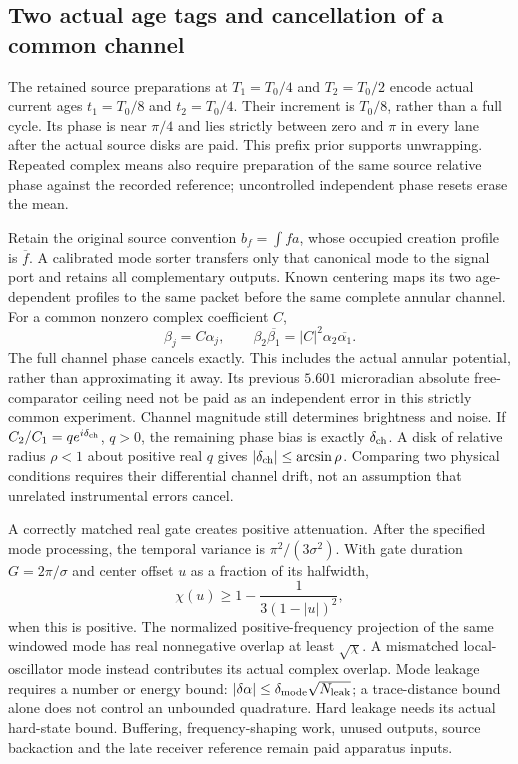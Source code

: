 \subsection{Two actual age tags and cancellation of a common channel}
The retained source preparations at $T_1=T_0/4$ and $T_2=T_0/2$ encode
actual current ages $t_1=T_0/8$ and $t_2=T_0/4$.  Their increment is
$T_0/8$, rather than a full cycle.  Its phase is near $\pi/4$ and lies
strictly between zero and $\pi$ in every lane after the actual source disks
are paid.  This prefix prior supports unwrapping.  Repeated complex means
also require preparation of the same source relative phase against the
recorded reference; uncontrolled independent phase resets erase the mean.

Retain the original source convention $b_f=\int f a$, whose occupied
creation profile is $\overline f$.  A calibrated mode sorter transfers only
that canonical mode to the signal port and retains all complementary
outputs.  Known centering maps its two age-dependent profiles to the same
packet before the same complete annular channel.  For a common nonzero
complex coefficient $C$,
\[
 \beta_j=C\alpha_j,\qquad
 \beta_2\overline{\beta_1}
   =|C|^2\alpha_2\overline{\alpha_1}.
\]
The full channel phase cancels exactly.  This includes the actual annular
potential, rather than approximating it away.  Its previous $5.601$
microradian absolute free-comparator ceiling need not be paid as an
independent error in this strictly common experiment.  Channel magnitude
still determines brightness and noise.  If
$C_2/C_1=q e^{i\delta_{\rm ch}}$, $q>0$, the remaining phase bias is exactly
$\delta_{\rm ch}$.  A disk of relative radius $\rho<1$ about positive real
$q$ gives $|\delta_{\rm ch}|\leq\arcsin\rho$.  Comparing two physical
conditions requires their differential channel drift, not an assumption
that unrelated instrumental errors cancel.

A correctly matched real gate creates positive attenuation.  After the
specified mode processing, the temporal variance is
$\pi^2/(3\sigma^2)$.  With gate duration $G=2\pi/\sigma$ and center offset
$u$ as a fraction of its halfwidth,
\[
 \chi(u)\geq1-\frac{1}{3(1-|u|)^2},
\]
when this is positive.  The normalized positive-frequency projection of
the same windowed mode has real nonnegative overlap at least
$\sqrt\chi$.  A mismatched local-oscillator mode instead contributes its
actual complex overlap.  Mode leakage requires a number or energy bound:
$|\delta\alpha|\leq\delta_{\rm mode}\sqrt{N_{\rm leak}}$; a trace-distance
bound alone does not control an unbounded quadrature.  Hard leakage needs
its actual hard-state bound.  Buffering, frequency-shaping work, unused
outputs, source backaction and the late receiver reference remain paid
apparatus inputs.

